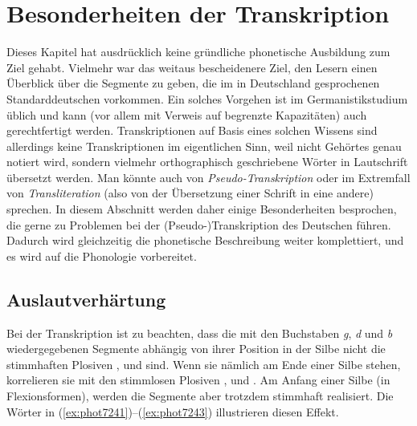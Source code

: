 

\section{Besonderheiten der Transkription}

\label{sec:besonderheitendertranskription}

Dieses Kapitel hat ausdrücklich keine gründliche phonetische Ausbildung zum Ziel gehabt.
Vielmehr war das weitaus bescheidenere Ziel, den Lesern einen Überblick über die Segmente zu geben, die im in Deutschland gesprochenen Standarddeutschen vorkommen.
Ein solches Vorgehen ist im Germanistikstudium üblich und kann (vor allem mit Verweis auf begrenzte Kapazitäten) auch gerechtfertigt werden.
Transkriptionen auf Basis eines solchen Wissens sind allerdings keine Transkriptionen im eigentlichen Sinn, weil nicht Gehörtes genau notiert wird, sondern vielmehr orthographisch geschriebene Wörter in Lautschrift übersetzt werden.
Man könnte auch von \textit{Pseudo-Transkription} oder im Extremfall von \textit{Transliteration} (also von der Übersetzung einer Schrift in eine andere) sprechen.
In diesem Abschnitt werden daher einige Besonderheiten besprochen, die gerne zu Problemen bei der (Pseudo-)Transkription des Deutschen führen.
Dadurch wird gleichzeitig die phonetische Beschreibung weiter komplettiert, und es wird auf die Phonologie vorbereitet.

\subsection{Auslautverhärtung}

\label{sec:auslautverhaertungphonetik}


Bei der Transkription ist zu beachten, dass die mit den Buchstaben \textit{g}, \textit{d} und \textit{b} wiedergegebenen Segmente abhängig von ihrer Position in der Silbe nicht die stimmhaften Plosiven \textipa{[g]}, \textipa{[d]} und \textipa{[b]} sind.
Wenn sie nämlich am Ende einer Silbe stehen, korrelieren sie mit den stimmlosen Plosiven \textipa{[k]}, \textipa{[t]} und \textipa{[p]}.
Am Anfang einer Silbe (\zB in Flexionsformen), werden die Segmente aber trotzdem stimmhaft realisiert.
Die Wörter in (\ref{ex:phot7241})--(\ref{ex:phot7243}) illustrieren diesen Effekt.

